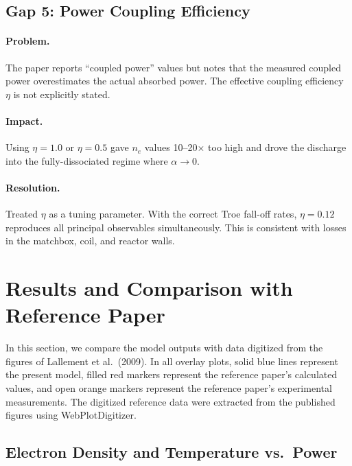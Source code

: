 \documentclass[11pt,a4paper]{article}
\newcommand{\nelec}{n_e}
\begin{document}
\subsection{Gap 5: Power Coupling Efficiency}

\paragraph{Problem.} The paper reports ``coupled power'' values but notes that the measured coupled power overestimates the actual absorbed power.  The effective coupling efficiency $\eta$ is not explicitly stated.

\paragraph{Impact.} Using $\eta = 1.0$ or $\eta = 0.5$ gave $\nelec$ values 10--20$\times$ too high and drove the discharge into the fully-dissociated regime where $\alpha \to 0$.

\paragraph{Resolution.} Treated $\eta$ as a tuning parameter.  With the correct Troe fall-off rates, $\eta = 0.12$ reproduces all principal observables simultaneously.  This is consistent with losses in the matchbox, coil, and reactor walls.

\section{Results and Comparison with Reference Paper}

In this section, we compare the model outputs with data digitized from the figures of Lallement et al.\ (2009).  In all overlay plots, solid blue lines represent the present model, filled red markers represent the reference paper's calculated values, and open orange markers represent the reference paper's experimental measurements.  The digitized reference data were extracted from the published figures using WebPlotDigitizer.

\subsection{Electron Density and Temperature vs.\ Power}
\end{document}
